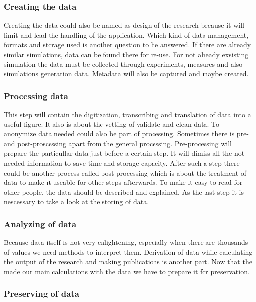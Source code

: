 \documentclass[]{article}
\begin{document}
\subsubsection{Creating the data}\label{creating-the-data}

Creating the data could also be named as design of the research because
it will limit and lead the handling of the application. Which kind of
data management, formats and storage used is another question to be
answered. If there are already similar simulations, data can be found
there for re-use. For not already exsisting simulation the data must be
collected through experiments, measures and also simulations generation
data. Metadata will also be captured and maybe created.

\subsubsection{Processing data}\label{processing-data}

This step will contain the digitization, transcribing and translation of
data into a useful figure. It also is about the vetting of validate and
clean data. To anonymize data needed could also be part of processing.
Sometimes there is pre- and post-proscessing apart from the general
processing. Pre-processing will prepare the particullar data just before
a certain step. It will dimiss all the not needed information to save
time and storage capacity. After such a step there could be another
process called post-processing which is about the treatment of data to
make it useable for other steps afterwards. To make it easy to read for
other people, the data should be described and explained. As the last
step it is nescessary to take a look at the storing of data.

\subsubsection{Analyzing of data}\label{analyzing-of-data}

Because data itself is not very enlightening, especially when there are
thousands of values we need methods to interpret them. Derivation of
data while calculating the output of the research and making
publications is another part. Now that the made our main calculations
with the data we have to prepare it for preservation.

\subsubsection{Preserving of data}\label{preserving-of-data}
\end{document}
